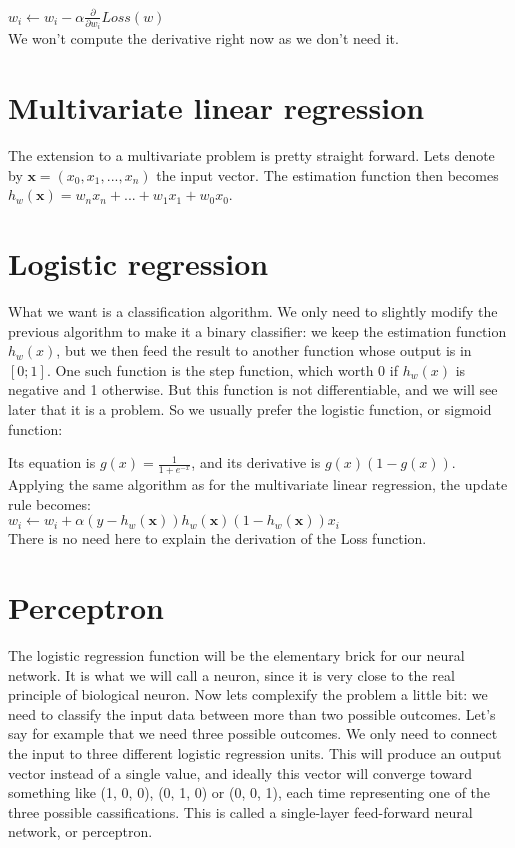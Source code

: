 $w_i \leftarrow w_i - \alpha \frac{\partial}{\partial w_i} Loss(w)$\\

We won't compute the derivative right now as we don't need it.

\section{Multivariate linear regression}

The extension to a multivariate problem is pretty straight forward. Lets denote
by $\textbf{x} = (x_0, x_1, ..., x_n)$ the input vector. The estimation function
then becomes $h_w(\textbf{x}) = w_nx_n + ... + w_1x_1 + w_0x_0$.

\section{Logistic regression}

What we want is a classification algorithm. We only need to slightly modify the
previous algorithm to make it a binary classifier: we keep the estimation
function $h_w(x)$, but we then feed the result to another function whose output
is in $[0;1]$. One such function is the step function, which worth 0 if $h_w(x)$
is negative and 1 otherwise. But this function is not differentiable, and we
will see later that it is a problem. So we usually prefer the logistic function,
or sigmoid function:\\

\begin{center}
\end{center}

Its equation is $g(x) = \frac{1}{1 + e^{-x}}$, and its derivative is
$g(x)(1 - g(x))$. Applying the same algorithm as for the multivariate linear
regression, the update rule becomes:\\

$w_i \leftarrow w_i + \alpha (y - h_w(\textbf{x}))
h_w(\textbf{x})(1 - h_w(\textbf{x}))x_i$\\

There is no need here to explain the derivation of the Loss function.

\section{Perceptron}

The logistic regression function will be the elementary brick for our neural
network. It is what we will call a neuron, since it is very close to the real
principle of biological neuron. Now lets complexify the problem a little bit: we
need to classify the input data between more than two possible outcomes. Let's
say for example that we need three possible outcomes. We only need to connect
the input to three different logistic regression units. This will produce an
output vector instead of a single value, and ideally this vector will converge
toward something like (1, 0, 0), (0, 1, 0) or (0, 0, 1), each time representing
one of the three possible cassifications. This is called a single-layer
feed-forward neural network, or perceptron.\\


